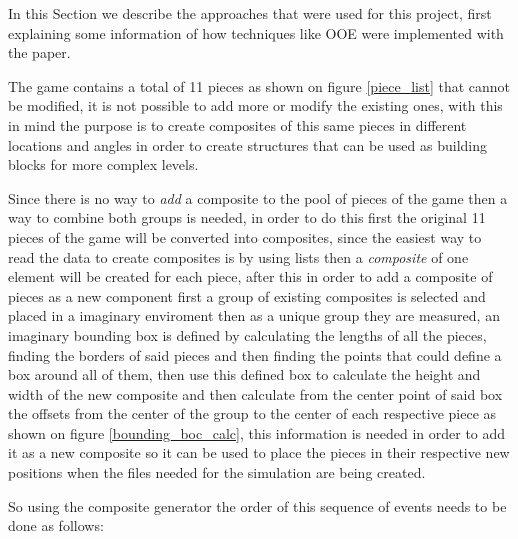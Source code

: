 \documentclass[conference]{IEEEtran}
\begin{document}
In this Section we describe the approaches that were used for this project, first 
explaining some information of how techniques like OOE were implemented with the paper.

The game contains a total of 11 pieces as shown on figure \ref{piece_list} that
cannot be modified, it is not possible to add more or modify the existing ones,
with this in mind the purpose is to create composites of this same pieces in
different locations and angles in order to create structures that can be used as
building blocks for more complex levels. 

Since there is no way to \textit{add} a composite to the pool of pieces of the 
game then a way to combine both groups is needed, in order to do this first the 
original 11 pieces of the game will be converted into composites, since the easiest
way to read the data to create composites is by using lists then a \textit{composite} 
of one element will be created for each piece, after this in order to add a 
composite of pieces as a new component first a group of existing composites is 
selected and placed in a imaginary enviroment then as a unique group they are 
measured, an imaginary bounding box is defined by calculating the lengths of all
the pieces, finding the borders of said pieces and then finding the points that could
define a box around all of them, then use this defined box to calculate the 
height and width of the new composite and then calculate from 
the center point of said box the offsets from the center of the
group to the center of each respective piece as shown on figure
\ref{bounding_boc_calc}, this information is needed in order to add it as a new
composite so it can be used to place the pieces in their respective new positions
when the files needed for the simulation are being created.

So using the composite generator the order of this sequence of
events needs to be done as follows:



\end{document}
